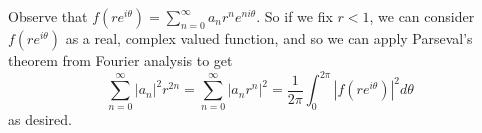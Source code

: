 \documentclass[11pt,letterpaper]{article}
\begin{document}
\begin{solution}
    Observe that $f(re^{i\theta})=\sum_{n=0}^\infty a_n r^n e^{ni\theta}$. So if we fix $r<1$, we can consider $f(re^{i\theta})$ as a real, complex valued function, and so we can apply Parseval's theorem from Fourier analysis to get
    \[
        \sum^\infty_{n=0} |a_n|^2 r^{2n}=\sum^{\infty}_{n=0} \left|a_nr^n\right|^2=\frac{1}{2\pi}\int^{2\pi}_0 |f(re^{i\theta})|^2d\theta
    \]
    as desired.  
\end{solution}
\end{document}
